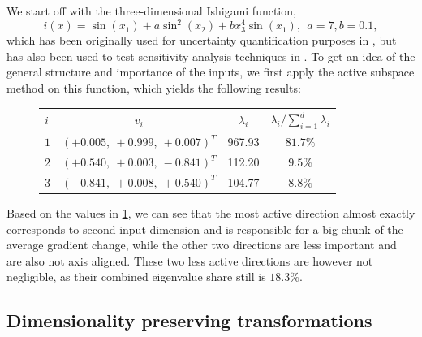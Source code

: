 \documentclass[
  a4paper,  %
  twoside,  %
  bibliography=totoc,
  headsepline,
  cleardoublepage=empty,
  parskip=half,
  draft=false
]{scrbook}
\begin{document}
We start off with the three-dimensional Ishigami function,
\begin{equation}
i(x)=\sin(x_1) + a \sin^2(x_2) + b x_3^4 \sin(x_1), ~~ a = 7, b=0.1,
\end{equation}
%
which has been originally used for uncertainty quantification purposes in \cite{Ishigami1990AnIQ}, but has also been used to test sensitivity analysis techniques in \cite{Sobol1999}.
To get an idea of the general structure and importance of the inputs, we first apply the active subspace method on this function, which yields the following results:
\begin{mdframed}[style=style]
\begin{figure}[H]
\centering

\bgroup
\def\arraystretch{1.2}%
  \begin{tabular}{ l | c c c}
$i$ & $v_i$ & $\lambda_i$ & $\lambda_i / \sum_{i=1}^d \lambda_i$\\
\hline
$1$ & $(+0.005, ~+0.999, ~+0.007)^T$ & 967.93 & $81.7\%$\\
$2$  & $(+0.540, ~+0.003, ~-0.841)^T$ & 112.20 & $9.5\%$\\
$3$ & $(-0.841, ~+0.008, ~+0.540)^T$ & 104.77 & $8.8\%$\\
\end{tabular}
\egroup
\vspace{0.5em}

\delimit

\label{tab:ishigami_as}
\end{figure}
\end{mdframed}
%
Based on the values in \cref{tab:ishigami_as}, we can see that the most active direction almost exactly corresponds to second input dimension and is responsible for a big chunk of the average gradient change, while the other two directions are less important and are also not axis aligned.
These two less active directions are however not negligible, as their combined eigenvalue share still is $18.3\%$.

\subsection{Dimensionality preserving transformations}
\end{document}
